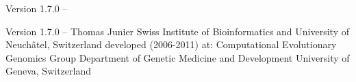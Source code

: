
\setuppagenumbering[state=stop]

\setuplayout[title]


\startalignment[middle]
Version 1.7.0 -- \currentdate \crlf
\blank[2*big]
 \crlf
{} \crlf
{} \crlf
{}
\stopalignment

\page

\startalignment[center]
Version 1.7.0 -- \currentdate \crlf
\blank[]
Thomas Junier  \crlf
\blank[]
Swiss Institute of Bioinformatics \crlf
and \crlf
University of Neuch\^{a}tel, Switzerland \crlf
\blank[]
developed (2006-2011) at: \crlf
Computational Evolutionary Genomics Group \crlf
Department of Genetic Medicine and Development \crlf
University of Geneva, Switzerland \crlf
\blank[]
\stopalignment

\page
\setuplayout[reset]
